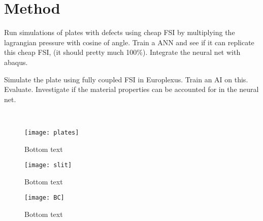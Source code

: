 \chapter{Method} \label{CH4}
Run simulations of plates with defects using cheap FSI by multiplying the lagrangian pressure with cosine of angle. Train a ANN and see if it can replicate this cheap FSI, (it should pretty much 100\%). Integrate the neural net with abaqus.

Simulate the plate using fully coupled FSI in Europlexus. Train an AI on this. Evaluate. Investigate if the material properties can be accounted for in the neural net.

\
\begin{figure}
    \centering
    \texttt{[image: plates]}
    \caption{Bottom text}
    \label{fig:plates}
\end{figure}

\begin{figure}
    \centering
    \texttt{[image: slit]}
    \caption{Bottom text}
    \label{fig:slit}
\end{figure}

\begin{figure}
    \centering
    \texttt{[image: BC]}
    \caption{Bottom text}
    \label{fig:bc}
\end{figure}